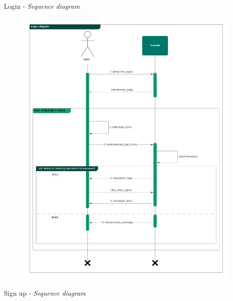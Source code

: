 \documentclass{article}
\begin{document}
\begin{legal}
\begin{legal}
\begin{legal}
{\begin{legal}
			\item Login - \textit{ Sequence diagram}
				\begin{figure}[H]
				\center
  				\includegraphics[width=160mm]{./images/seq-diagrams/Login_diagram.png}
				\end{figure}
			\newpage
			\item Sign up - \textit{ Sequence diagram}
				\begin{figure}[H]
				\center

\end{figure}
\end{legal}}
\end{legal}
\end{legal}
\end{legal}
\end{document}
